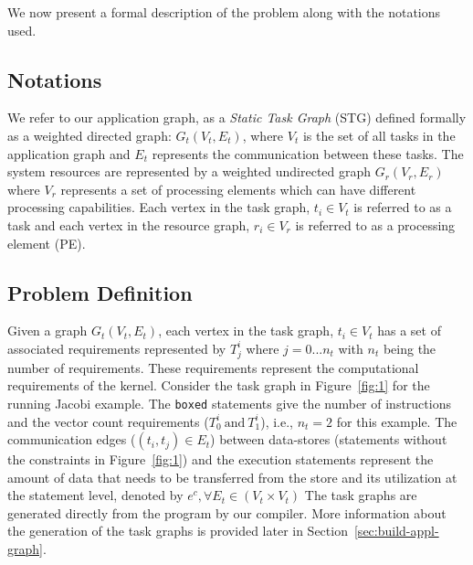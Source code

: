 \documentclass[10pt, conference, compsocconf]{IEEEtran}
\begin{document}
We now present a formal description of the problem along with the
notations used.

\subsection{Notations}

We refer to our application graph, as a \textit{Static Task Graph} (STG)
defined formally as a weighted directed graph: $G_t(V_t, E_t)$, where
$V_t$ is the set of all tasks in the application graph and $E_t$
represents the communication between these tasks. The system resources
are represented by a weighted undirected graph $G_r(V_r, E_r)$ where
$V_r$ represents a set of processing elements which can have different
processing capabilities. Each vertex in the task graph, $t_i \in V_t$ is
referred to as a task and each vertex in the resource graph, $r_i \in
V_r$ is referred to as a processing element
(PE). %

\subsection{Problem Definition}

Given a graph $G_t(V_t, E_t)$, each vertex in the task graph, $t_i \in
V_t$ has a set of associated requirements represented by $T^{i}_{j}$
where $j=0...n_t$ with $n_t$ being the number of requirements. These
requirements represent the computational requirements of the
kernel. Consider the task graph in Figure~\ref{fig:1} for the running
Jacobi example. The \texttt{boxed} statements give the number of
instructions and the vector count requirements ($T^i_0\ \mathrm{and}\
T^i_1$), i.e., $n_t=2$ for this example. The communication edges ($(t_i,
t_j) \in E_t$) between data-stores (statements without the constraints
in Figure~\ref{fig:1}) and the execution statements represent the amount
of data that needs to be transferred from the store and its utilization
at the statement level, denoted by $e^c, \forall E_t \in (V_t \times
V_t)$ The task graphs are generated directly from the program by our
compiler. More information about the generation of the task graphs is
provided later in Section~\ref{sec:build-appl-graph}.

\end{document}
